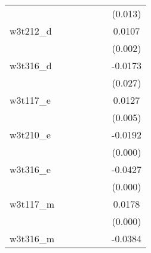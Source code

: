 {\begin{tabular}{l*{6}{c}}
            &                     &                     &                     &                     &                     &     (0.013)         \\
[1em]
w3t212\_d    &                     &                     &                     &                     &                     &      0.0107\sym{***}\\
            &                     &                     &                     &                     &                     &     (0.002)         \\
[1em]
w3t316\_d    &                     &                     &                     &                     &                     &     -0.0173\sym{**} \\
            &                     &                     &                     &                     &                     &     (0.027)         \\
[1em]
w3t117\_e    &                     &                     &                     &                     &                     &      0.0127\sym{***}\\
            &                     &                     &                     &                     &                     &     (0.005)         \\
[1em]
w3t210\_e    &                     &                     &                     &                     &                     &     -0.0192\sym{***}\\
            &                     &                     &                     &                     &                     &     (0.000)         \\
[1em]
w3t316\_e    &                     &                     &                     &                     &                     &     -0.0427\sym{***}\\
            &                     &                     &                     &                     &                     &     (0.000)         \\
[1em]
w3t117\_m    &                     &                     &                     &                     &                     &      0.0178\sym{***}\\
            &                     &                     &                     &                     &                     &     (0.000)         \\
[1em]
w3t316\_m    &                     &                     &                     &                     &                     &     -0.0384\sym{***}\\

\end{tabular}}
